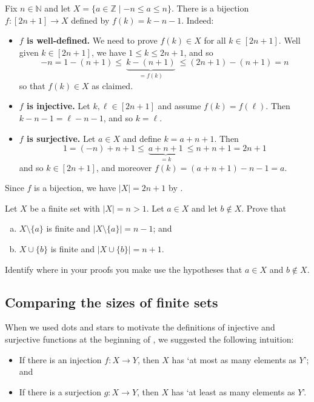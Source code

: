 \begin{example}
\label{exBijectionFromIntegersFromMinusNToNToBracketTwoNPlusOne}
Fix $n \in \mathbb{N}$ and let $X = \{ a \in \mathbb{Z} \mid -n \le a \le n \}$. There is a bijection $f : [2n+1] \to X$ defined by $f(k) = k-n-1$. Indeed:
\begin{itemize}
\item \textbf{$f$ is well-defined.}
We need to prove $f(k) \in X$ for all $k \in [2n+1]$. Well given $k \in [2n+1]$, we have $1 \le k \le 2n+1$, and so
\[ -n = 1-(n+1) \le ~ \underbrace{k-(n+1)}_{=f(k)} ~  \le (2n+1) - (n+1) = n \]
so that $f(k) \in X$ as claimed.
\item \textbf{$f$ is injective.} Let $k, \ell \in [2n+1]$ and assume $f(k) = f(\ell)$. Then $k - n - 1 = \ell - n - 1$, and so $k = \ell$.
\item \textbf{$f$ is surjective.} Let $a \in X$ and define $k = a+n+1$. Then
\[ 1 = (-n) + n + 1 \le ~ \underbrace{a + n + 1}_{= k} ~ \le n + n + 1 = 2n+1 \]
and so $k \in [2n+1]$, and moreover $f(k) = (a+n+1)-n-1 = a$.
\end{itemize}
Since $f$ is a bijection, we have $|X| = 2n+1$ by .
\end{example}

\begin{exercise}
\label{exAddRemoveElementsOfFiniteSets}
Let $X$ be a finite set with $|X| = n > 1$. Let $a \in X$ and let $b \not \in X$. Prove that
\begin{enumerate}[(a)]
\item $X \setminus \{ a \}$ is finite and $|X \setminus \{ a \}| = n-1$; and
\item $X \cup \{ b \}$ is finite and $|X \cup \{ b \}| = n+1$.
\end{enumerate}
Identify where in your proofs you make use the hypotheses that $a \in X$ and $b \not \in X$.
\end{exercise}

\subsection*{Comparing the sizes of finite sets}

When we used dots and stars to motivate the definitions of injective and surjective functions at the beginning of , we suggested the following intuition:
\begin{itemize} 
\item If there is an injection $f : X \to Y$, then $X$ has `at most as many elements as $Y$'; and
\item If there is a surjection $g : X \to Y$, then $X$ has `at least as many elements as $Y$'.
\end{itemize}

